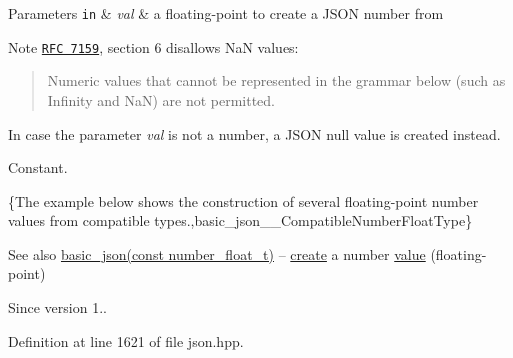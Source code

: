 \begin{DoxyParams}[1]{Parameters}
\mbox{\tt in}  & {\em val} & a floating-\/point to create a J\+S\+O\+N number from\\
\hline
\end{DoxyParams}
\begin{DoxyNote}{Note}
\href{http://www.rfc-editor.org/rfc/rfc7159.txt}{\tt R\+F\+C 7159}, section 6 disallows Na\+N values\+: \begin{quote}
Numeric values that cannot be represented in the grammar below (such as Infinity and Na\+N) are not permitted. \end{quote}
In case the parameter {\itshape val} is not a number, a J\+S\+O\+N null value is created instead.
\end{DoxyNote}
Constant.

\{The example below shows the construction of several floating-\/point number values from compatible types.,basic\+\_\+json\+\_\+\+\_\+\+Compatible\+Number\+Float\+Type\}

\begin{DoxySeeAlso}{See also}
\hyperlink{classnlohmann_1_1basic__json_a2badcf191deabf579abcf8d3654da26f}{basic\+\_\+json(const number\+\_\+float\+\_\+t)} -- \hyperlink{classnlohmann_1_1basic__json_a27df4303fbc83071275074486b54a40e}{create} a number \hyperlink{classnlohmann_1_1basic__json_a0a2cbbd95862a623e7dc5c37e67dead0}{value} (floating-\/point)
\end{DoxySeeAlso}
\begin{DoxySince}{Since}
version 1.. 
\end{DoxySince}


Definition at line 1621 of file json.\+hpp.

\hypertarget{classnlohmann_1_1basic__json_afeb998aec45296bc2050bd1c41ef41eb}{}
